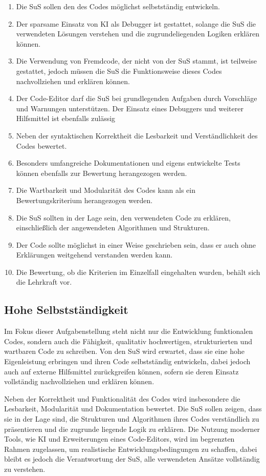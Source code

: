 \documentclass[a4paper,12pt]{article}
\begin{document}
\begin{enumerate}[label=\S\ \arabic*]
    \item Die SuS sollen den des Codes möglichst selbstständig entwickeln.
    \item Der sparsame Einsatz von KI als Debugger ist gestattet, solange die SuS die verwendeten Lösungen verstehen und die zugrundeliegenden Logiken erklären können.
    \item Die Verwendung von Fremdcode, der nicht von der SuS stammt, ist teilweise gestattet, jedoch müssen die SuS die Funktionsweise dieses Codes nachvollziehen und erklären können.
    \item Der Code-Editor darf die SuS bei grundlegenden Aufgaben durch Vorschläge und Warnungen unterstützen. Der Einsatz eines Debuggers und weiterer Hilfsmittel ist ebenfalls zulässig
    \item Neben der syntaktischen Korrektheit die Lesbarkeit und Verständlichkeit des Codes bewertet.
    \item Besonders umfangreiche Dokumentationen und eigens entwickelte Tests können ebenfalls zur Bewertung herangezogen werden.
    \item Die Wartbarkeit und Modularität des Codes kann als ein Bewertungskriterium herangezogen werden.
    \item Die SuS sollten in der Lage sein, den verwendeten Code zu erklären, einschließlich der angewendeten Algorithmen und Strukturen.
    \item Der Code sollte möglichst in einer Weise geschrieben sein, dass er auch ohne Erklärungen weitgehend verstanden werden kann.
    \item Die Bewertung, ob die Kriterien im Einzelfall eingehalten wurden, behält sich die Lehrkraft vor.
\end{enumerate}


\subsection{Hohe Selbstständigkeit}
Im Fokus dieser Aufgabenstellung steht nicht nur die Entwicklung funktionalen Codes, sondern auch die Fähigkeit, qualitativ hochwertigen, strukturierten und wartbaren Code zu schreiben. Von den SuS wird erwartet, dass sie eine hohe Eigenleistung erbringen und ihren Code selbstständig entwickeln, dabei jedoch auch auf externe Hilfsmittel zurückgreifen können, sofern sie deren Einsatz vollständig nachvollziehen und erklären können.

Neben der Korrektheit und Funktionalität des Codes wird insbesondere die Lesbarkeit, Modularität und Dokumentation bewertet. Die SuS sollen zeigen, dass sie in der Lage sind, die Strukturen und Algorithmen ihres Codes verständlich zu präsentieren und die zugrunde liegende Logik zu erklären. Die Nutzung moderner Tools, wie KI und Erweiterungen eines Code-Editors, wird im begrenzten Rahmen zugelassen, um realistische Entwicklungsbedingungen zu schaffen, dabei bleibt es jedoch die Verantwortung der SuS, alle verwendeten Ansätze vollständig zu verstehen.
\end{document}
